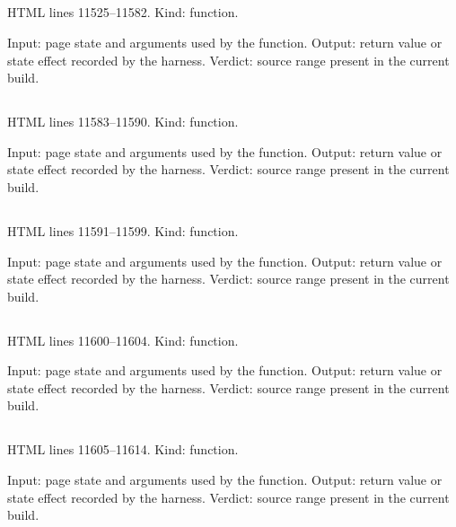\subsection*{\texttt{}}
\label{vf_642_cmdExec}
HTML lines 11525--11582. Kind: function.

Input: page state and arguments used by the function.
Output: return value or state effect recorded by the harness.
Verdict: source range present in the current build.

\subsection*{\texttt{}}
\label{vf_643_cmdRunLine}
HTML lines 11583--11590. Kind: function.

Input: page state and arguments used by the function.
Output: return value or state effect recorded by the harness.
Verdict: source range present in the current build.

\subsection*{\texttt{}}
\label{vf_644_cmdRunScript}
HTML lines 11591--11599. Kind: function.

Input: page state and arguments used by the function.
Output: return value or state effect recorded by the harness.
Verdict: source range present in the current build.

\subsection*{\texttt{}}
\label{vf_645_cmdScriptToggle}
HTML lines 11600--11604. Kind: function.

Input: page state and arguments used by the function.
Output: return value or state effect recorded by the harness.
Verdict: source range present in the current build.

\subsection*{\texttt{}}
\label{vf_646_cmdOpen}
HTML lines 11605--11614. Kind: function.

Input: page state and arguments used by the function.
Output: return value or state effect recorded by the harness.
Verdict: source range present in the current build.

